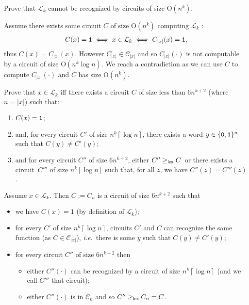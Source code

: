 \documentclass[fontsize=16pt,a4paper,DIV=17,parskip=half]{scrartcl}
\renewcommand{\mathsf}[1]{\text{\normalfont\sffamily#1}}
\renewcommand{\texttt}[1]{\text{\normalfont\ttfamily#1}}
\theoremstyle{definition}
\begin{document}
  \begin{que}
    Prove that $\mathcal{L}_k$ cannot be recognized by circuits of size $\mathrm{O}(n^k)$.
    \label{que8}
  \end{que}

  Assume there exists some circuit $C$ of size $\mathrm{O}(n^k)$ computing $\mathcal{L}_k$ :
  \[
    C(x) = \texttt{1} \iff x \in \mathcal{L}_k \iff C_{|x|}(x) = \texttt{1}
  ,\]
  thus $C(x) = C_{|x|}(x)$.
  However $C_{|x|} \in \mathcal{C}_{|x|}$ and so $C_{|x|}(\cdot)$ is not computable by a circuit of size $\mathrm{O}(n^k \log n)$.
  We reach a contradiction as we can use $C$ to compute $C_{|x|}(\cdot)$ and $C$ has size $\mathrm{O}(n^k)$.

  \begin{que}
    Prove that $x \in \mathcal{L}_k$ iff there exists a circuit $C$ of size less than $6 n^{k+2}$ (where~$n = |x|$) such that:
    \begin{enumerate}
      \item $C(x) = \texttt{1}$;
      \item and, for every circuit $C'$ of size $n^k \left\lceil \log n \right\rceil$, there exists a word $y \in \{\texttt{0},\texttt{1}\}^n$ such that $C(y) \neq C'(y)$;
      \item and for every circuit $C''$ of size $6n^{k+2}$, either $C'' \ge_\mathsf{lex} C$~or there exists a circuit~$C'''$ of size $n^k \left\lceil \log n \right\rceil$ such that, for all $z$, we have $C''(z)  = C'''(z)$.
    \end{enumerate}
    \label{que9}
  \end{que}

  Assume $x \in \mathcal{L}_k$.
  Then $C := C_n$ is a circuit of size $6n^{k+2}$ such that
  \begin{itemize}
    \item we have $C(x) = 1$ (by definition of $\mathcal{L}_k$);
    \item for every $C'$ of size $n^k \left\lceil \log n \right\rceil$, circuits $C'$ and $C$ can recognize the same function (as $C \in \mathcal{C}_{|x|}$), \textit{i.e.}\ there is some $y$ such that $C(y) \neq C'(y)$;
    \item for every circuit $C''$ of size $6 n^{k+2}$ then
      \begin{itemize}
        \item either $C''(\cdot)$ can  be recognized by a circuit of size $n^k \left\lceil \log n \right\rceil$ (and we call $C'''$ that circuit);
        \item either  $C''(\cdot)$ is in $\mathcal{C}_n$ and so $C'' \ge_{\mathsf{lex}} C_n = C$.
      \end{itemize}
  \end{itemize}
\end{document}
